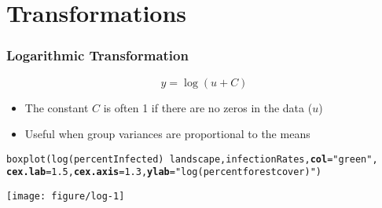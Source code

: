 \documentclass[color=usenames,dvipsnames]{beamer}\usepackage[]{graphicx}\usepackage[]{color}
\makeatletter
\newcommand{\hlnum}[1]{\textcolor[rgb]{0.69,0.494,0}{#1}}%
\newcommand{\hlstr}[1]{\textcolor[rgb]{0.749,0.012,0.012}{#1}}%
\newcommand{\hlopt}[1]{\textcolor[rgb]{0,0,0}{#1}}%
\newcommand{\hlstd}[1]{\textcolor[rgb]{0,0,0}{#1}}%
\newcommand{\hlkwc}[1]{\textcolor[rgb]{0,0,0}{\textbf{#1}}}%
\newcommand{\hlkwd}[1]{\textcolor[rgb]{0.004,0.004,0.506}{#1}}%
\newenvironment{kframe}{%
 \def\at@end@of@kframe{}%
 \ifinner\ifhmode%
  \def\at@end@of@kframe{\end{minipage}}%
  \begin{minipage}{\columnwidth}%
 \fi\fi%
 \def\FrameCommand##1{\hskip\@totalleftmargin \hskip-\fboxsep
 \colorbox{shadecolor}{##1}\hskip-\fboxsep
     \hskip-\linewidth \hskip-\@totalleftmargin \hskip\columnwidth}%
 \MakeFramed {\advance\hsize-\width
   \@totalleftmargin\z@ \linewidth\hsize
   \@setminipage}}%
 {\par\unskip\endMakeFramed%
 \at@end@of@kframe}
\newenvironment{knitrout}{}{} %
\makeatother
\begin{document}
\section{Transformations}








\begin{frame}[fragile]
  \frametitle{Logarithmic Transformation}
  \[
  y = \log(u + C)
  \]
  \begin{itemize}%
    \small %
    \item The constant $C$ is often 1 if there are no zeros in the data ($u$)
    \item Useful when group variances are proportional to the means
  \end{itemize}
  \pause
\begin{knitrout}\scriptsize
{}\color{fgcolor}\begin{kframe}
\begin{alltt}
\hlkwd{boxplot}\hlstd{(}\hlkwd{log}\hlstd{(percentInfected)}\hlopt{~}\hlstd{landscape, infectionRates,} \hlkwc{col}\hlstd{=}\hlstr{"green"}\hlstd{,}
        \hlkwc{cex.lab}\hlstd{=}\hlnum{1.5}\hlstd{,} \hlkwc{cex.axis}\hlstd{=}\hlnum{1.3}\hlstd{,} \hlkwc{ylab}\hlstd{=}\hlstr{"log(percent forest cover)"}\hlstd{)}
\end{alltt}
\end{kframe}

{\centering \texttt{[image: figure/log-1]} 

}



\end{knitrout}
\end{frame}



\end{document}
